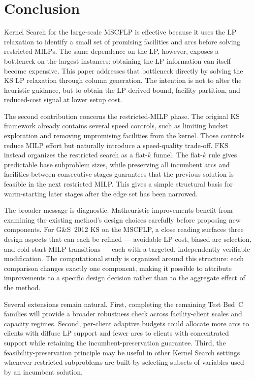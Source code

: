 \section{Conclusion}
\label{sec:conclusion}

Kernel Search for the large-scale MSCFLP is effective because it uses the LP
relaxation to identify a small set of promising facilities and arcs before
solving restricted MILPs.
The same dependence on the LP, however, exposes a bottleneck on the largest
instances: obtaining the LP information can itself become expensive.
This paper addresses that bottleneck directly by solving the KS LP relaxation
through column generation.
The intention is not to alter the heuristic guidance, but to obtain the
LP-derived bound, facility partition, and reduced-cost signal at lower setup
cost.

The second contribution concerns the restricted-MILP phase.
The original KS framework already contains several speed controls, such as
limiting bucket exploration and removing unpromising facilities from the kernel.
Those controls reduce MILP effort but naturally introduce a speed-quality
trade-off.
FKS instead organizes the restricted search as a flat-$k$ funnel.
The flat-$k$ rule gives predictable base subproblem sizes, while preserving all
incumbent arcs and facilities between consecutive stages guarantees that the
previous solution is feasible in the next restricted MILP.
This gives a simple structural basis for warm-starting later stages after the
edge set has been narrowed.

The broader message is diagnostic.
Matheuristic improvements benefit from examining the existing method's design
choices carefully before proposing new components.
For G\&S~2012 KS on the MSCFLP, a close reading surfaces three design aspects
that can each be refined --- avoidable LP cost, biased arc selection, and
cold-start MILP transitions --- each with a targeted, independently verifiable
modification.
The computational study is organized around this structure: each comparison
changes exactly one component, making it possible to attribute improvements
to a specific design decision rather than to the aggregate effect of the method.

Several extensions remain natural.
First, completing the remaining Test Bed~C families will provide
a broader robustness check across facility-client scales and capacity regimes.
Second, per-client adaptive budgets could allocate more arcs to clients with
diffuse LP support and fewer arcs to clients with concentrated support while
retaining the incumbent-preservation guarantee.
Third, the feasibility-preservation principle may be useful in other Kernel
Search settings whenever restricted subproblems are built by selecting subsets
of variables used by an incumbent solution.
